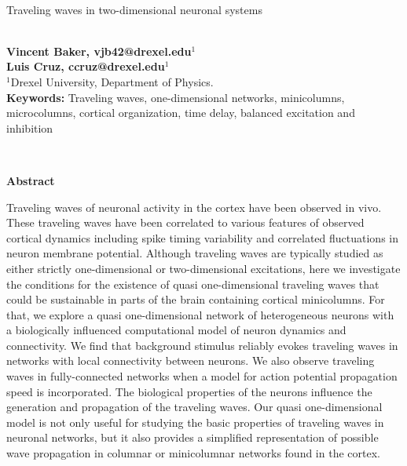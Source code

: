 \documentclass[12pt]{article}
\begin{document}
\hspace{13.9cm}

\ \vspace{20mm}\\

{\LARGE Traveling waves in two-dimensional neuronal systems}

\ \\
{\bf \large Vincent Baker, vjb42@drexel.edu$^{\displaystyle 1}$}\\
{\bf \large Luis Cruz, ccruz@drexel.edu$^{\displaystyle 1}$}\\
{$^{\displaystyle 1}$Drexel University, Department of Physics.}\\
%

{\bf Keywords:} Traveling waves, one-dimensional networks, minicolumns, microcolumns, cortical organization, time delay, balanced excitation and inhibition

\thispagestyle{empty}
%
\ \vspace{-0mm}\\
%
\begin{center} {\bf Abstract} \end{center}
Traveling waves of neuronal activity in the cortex have been observed in vivo.
These traveling waves have been correlated to various features of observed cortical dynamics including spike timing variability and correlated fluctuations in neuron membrane potential.
Although traveling waves are typically studied as either strictly one-dimensional or two-dimensional excitations, here we investigate the conditions for the existence of quasi  one-dimensional traveling waves that could be sustainable in parts of the brain containing cortical minicolumns.
For that, we explore a quasi  one-dimensional network of heterogeneous neurons with a biologically influenced computational model of neuron dynamics and connectivity.
We find that background stimulus reliably evokes traveling waves in networks with local connectivity between neurons.
We also observe traveling waves in fully-connected networks when a model for action potential propagation speed is incorporated.
The biological properties of the neurons influence the generation and propagation of the traveling waves. 
Our quasi  one-dimensional model is not only useful for studying the basic properties of traveling waves in neuronal networks, but it also provides a simplified representation of possible wave propagation in columnar or minicolumnar networks found in the cortex.
\end{document}
